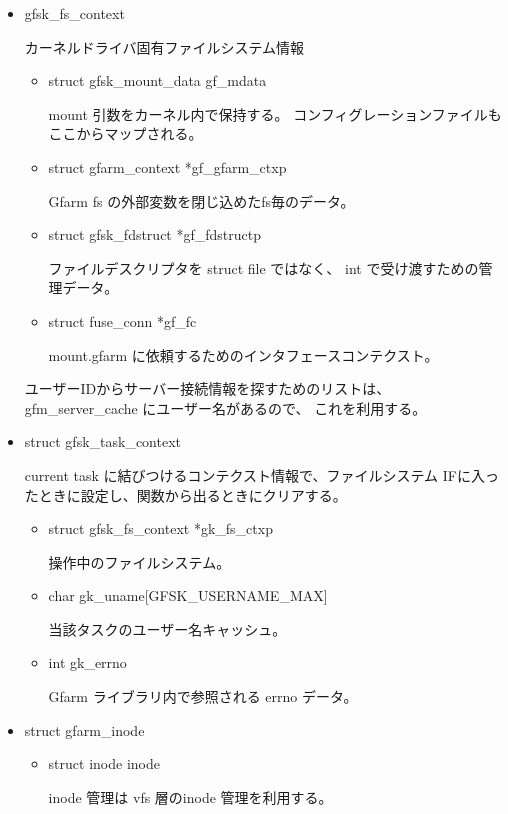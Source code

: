 	\begin{itemize}
	\item	gfsk_fs_context	\par
		カーネルドライバ固有ファイルシステム情報
		\begin{itemize}
		\item	struct gfsk_mount_data  gf_mdata	\par
			mount 引数をカーネル内で保持する。
			コンフィグレーションファイルもここからマップされる。
		\item	struct gfarm_context    *gf_gfarm_ctxp	\par
			Gfarm fs の外部変数を閉じ込めたfs毎のデータ。
		\item	struct gfsk_fdstruct    *gf_fdstructp	\par
			ファイルデスクリプタを struct file ではなく、
			int で受け渡すための管理データ。
		\item	struct fuse_conn        *gf_fc	\par
			mount.gfarm に依頼するためのインタフェースコンテクスト。
		\end{itemize}

		ユーザーIDからサーバー接続情報を探すためのリストは、
		gfm_server_cache にユーザー名があるので、 これを利用する。

        \item	struct gfsk_task_context \par
		current task に結びつけるコンテクスト情報で、ファイルシステム
		IFに入ったときに設定し、関数から出るときにクリアする。

		\begin{itemize}
		\item	struct gfsk_fs_context *gk_fs_ctxp \par
			操作中のファイルシステム。
		\item	char    gk_uname[GFSK_USERNAME_MAX] \par
			当該タスクのユーザー名キャッシュ。
		\item	int gk_errno \par
			Gfarm ライブラリ内で参照される errno データ。
		\end{itemize}
        \item	struct gfarm_inode \par

		\begin{itemize}
		\item	struct inode         inode \par

		inode 管理は vfs 層のinode 管理を利用する。


\end{itemize}
\end{itemize}
